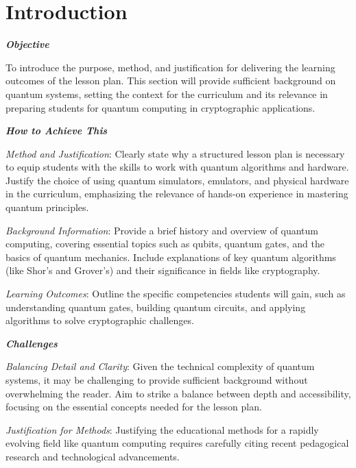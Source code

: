\section{Introduction}

\textbf{\emph{Objective}}

To introduce the purpose, method, and justification for delivering the learning outcomes of the lesson plan. This section will provide sufficient background on quantum systems, setting the context for the curriculum and its relevance in preparing students for quantum computing in cryptographic applications.

\textbf{\emph{How to Achieve This}}

\emph{Method and Justification}: Clearly state why a structured lesson plan is necessary to equip students with the skills to work with quantum algorithms and hardware. Justify the choice of using quantum simulators, emulators, and physical hardware in the curriculum, emphasizing the relevance of hands-on experience in mastering quantum principles.

\emph{Background Information}: Provide a brief history and overview of quantum computing, covering essential topics such as qubits, quantum gates, and the basics of quantum mechanics. Include explanations of key quantum algorithms (like Shor’s and Grover’s) and their significance in fields like cryptography.

\emph{Learning Outcomes}: Outline the specific competencies students will gain, such as understanding quantum gates, building quantum circuits, and applying algorithms to solve cryptographic challenges.

\textbf{\emph{Challenges}}

\emph{Balancing Detail and Clarity}: Given the technical complexity of quantum systems, it may be challenging to provide sufficient background without overwhelming the reader. Aim to strike a balance between depth and accessibility, focusing on the essential concepts needed for the lesson plan.

\emph{Justification for Methods}: Justifying the educational methods for a rapidly evolving field like quantum computing requires carefully citing recent pedagogical research and technological advancements.

